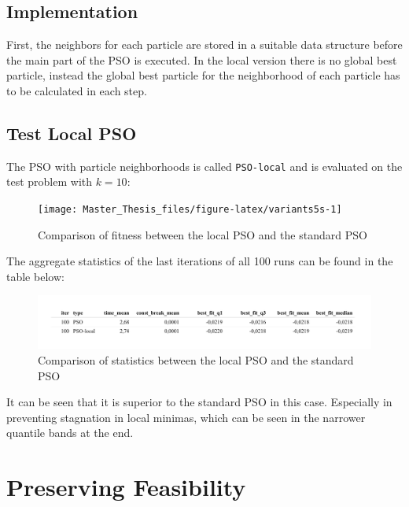 \documentclass[
  oneside, a4paper, 12pt, openany]{book}
\theoremstyle{definition}
\theoremstyle{definition}
\theoremstyle{definition}
\theoremstyle{definition}
\theoremstyle{remark}
\begin{document}
\hypertarget{implementation-1}{%
\subsection{Implementation}\label{implementation-1}}

First, the neighbors for each particle are stored in a suitable data structure before the main part of the PSO is executed. In the local version there is no global best particle, instead the global best particle for the neighborhood of each particle has to be calculated in each step.

\hypertarget{test-local-pso}{%
\subsection{Test Local PSO}\label{test-local-pso}}

The PSO with particle neighborhoods is called \texttt{PSO-local} and is evaluated on the test problem with \(k=10\):

\begin{figure}[H]
\texttt{[image: Master\_Thesis\_files/figure-latex/variants5s-1]} \caption{Comparison of fitness between the local PSO and the standard PSO}\label{fig:variants5s}
\end{figure}

The aggregate statistics of the last iterations of all 100 runs can be found in the table below:

\begin{figure}[H]
\includegraphics{Master_Thesis_files/figure-latex/variants6-1} \caption{Comparison of statistics between the local PSO and the standard PSO}\label{fig:variants6}
\end{figure}

It can be seen that it is superior to the standard PSO in this case. Especially in preventing stagnation in local minimas, which can be seen in the narrower quantile bands at the end.

\hypertarget{preserving-feasibility}{%
\section{Preserving Feasibility}\label{preserving-feasibility}}
\end{document}
